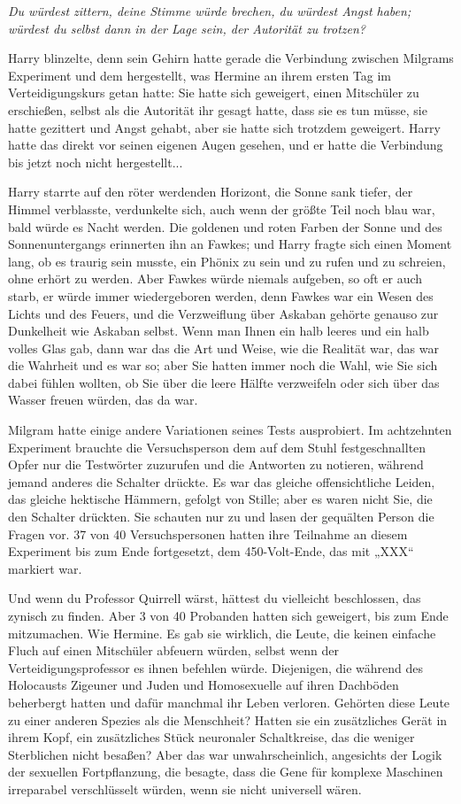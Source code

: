 {\emph{Du würdest zittern, deine Stimme würde brechen, du würdest Angst haben; würdest du selbst dann in der Lage sein, der Autorität zu trotzen?}

Harry blinzelte, denn sein Gehirn hatte gerade die Verbindung zwischen Milgrams Experiment und dem hergestellt, was Hermine an ihrem ersten Tag im Verteidigungskurs getan hatte: Sie hatte sich geweigert, einen Mitschüler zu erschießen, selbst als die Autorität ihr gesagt hatte, dass sie es tun müsse, sie hatte gezittert und Angst gehabt, aber sie hatte sich trotzdem geweigert. Harry hatte das direkt vor seinen eigenen Augen gesehen, und er hatte die Verbindung bis jetzt noch nicht hergestellt...

Harry starrte auf den röter werdenden Horizont, die Sonne sank tiefer, der Himmel verblasste, verdunkelte sich, auch wenn der größte Teil noch blau war, bald würde es Nacht werden. Die goldenen und roten Farben der Sonne und des Sonnenuntergangs erinnerten ihn an Fawkes; und Harry fragte sich einen Moment lang, ob es traurig sein musste, ein Phönix zu sein und zu rufen und zu schreien, ohne erhört zu werden. Aber Fawkes würde niemals aufgeben, so oft er auch starb, er würde immer wiedergeboren werden, denn Fawkes war ein Wesen des Lichts und des Feuers, und die Verzweiflung über Askaban gehörte genauso zur Dunkelheit wie Askaban selbst. Wenn man Ihnen ein halb leeres und ein halb volles Glas gab, dann war das die Art und Weise, wie die Realität war, das war die Wahrheit und es war so; aber Sie hatten immer noch die Wahl, wie Sie sich dabei fühlen wollten, ob Sie über die leere Hälfte verzweifeln oder sich über das Wasser freuen würden, das da war.

Milgram hatte einige andere Variationen seines Tests ausprobiert. Im achtzehnten Experiment brauchte die Versuchsperson dem auf dem Stuhl festgeschnallten Opfer nur die Testwörter zuzurufen und die Antworten zu notieren, während jemand anderes die Schalter drückte. Es war das gleiche offensichtliche Leiden, das gleiche hektische Hämmern, gefolgt von Stille; aber es waren nicht Sie, die den Schalter drückten. Sie schauten nur zu und lasen der gequälten Person die Fragen vor. 37 von 40 Versuchspersonen hatten ihre Teilnahme an diesem Experiment bis zum Ende fortgesetzt, dem 450-Volt-Ende, das mit „XXX“ markiert war.

Und wenn du Professor Quirrell wärst, hättest du vielleicht beschlossen, das zynisch zu finden. Aber 3 von 40 Probanden hatten sich geweigert, bis zum Ende mitzumachen. Wie Hermine. Es gab sie wirklich, die Leute, die keinen einfache Fluch auf einen Mitschüler abfeuern würden, selbst wenn der Verteidigungsprofessor es ihnen befehlen würde. Diejenigen, die während des Holocausts Zigeuner und Juden und Homosexuelle auf ihren Dachböden beherbergt hatten und dafür manchmal ihr Leben verloren. Gehörten diese Leute zu einer anderen Spezies als die Menschheit? Hatten sie ein zusätzliches Gerät in ihrem Kopf, ein zusätzliches Stück neuronaler Schaltkreise, das die weniger Sterblichen nicht besaßen? Aber das war unwahrscheinlich, angesichts der Logik der sexuellen Fortpflanzung, die besagte, dass die Gene für komplexe Maschinen irreparabel verschlüsselt würden, wenn sie nicht universell wären.

}

